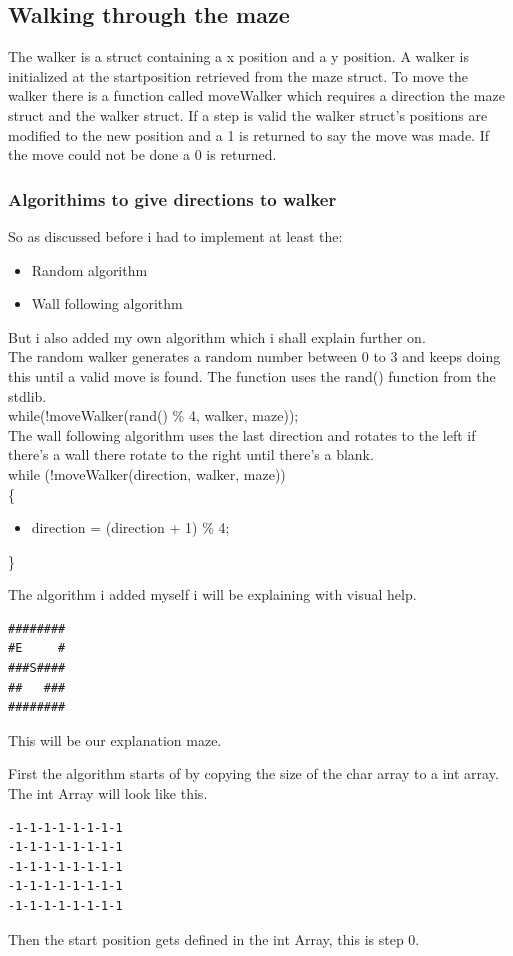 \documentclass[pdftex,12pt,a4paper]{article}
\begin{document}
\subsection{Walking through the maze}
The walker is a struct containing a x position and a y position.
A walker is initialized at the startposition retrieved from the maze struct.
To move the walker there is a function called moveWalker which requires a direction the maze struct and the walker struct. If a step is valid the walker struct's positions are modified to the new position and a 1 is returned to say the move was made. If the move could not be done a 0 is returned.
\subsubsection{Algorithims to give directions to walker}
So as discussed before i had to implement at least the:
\begin{itemize}
\item Random algorithm
\item Wall following algorithm
\end{itemize}
But i also added my own algorithm which i shall explain further on.
\\

The random walker generates a random number between 0 to 3 and keeps doing this until a valid move is found. The function uses the rand() function from the stdlib.\\
while(!moveWalker(rand() \% 4, walker, maze));
\\

The wall following algorithm uses the last direction and rotates to the left if there's a wall there rotate to the right until there's a blank.\\
while (!moveWalker(direction, walker, maze))\\
\{
\begin{itemize}
\item[] direction = (direction + 1) \% 4;
\end{itemize}
\}

The algorithm i added myself i will be explaining with visual help.
\begin{verbatim}
########
#E     #
###S####
##   ###
########
\end{verbatim}
This will be our explanation maze.

First the algorithm starts of by copying the size of the char array to a int array.
The int Array will look like this.
\begin{verbatim}
-1-1-1-1-1-1-1-1
-1-1-1-1-1-1-1-1
-1-1-1-1-1-1-1-1
-1-1-1-1-1-1-1-1
-1-1-1-1-1-1-1-1
\end{verbatim}
Then the start position gets defined in the int Array, this is step 0.
\end{document}
